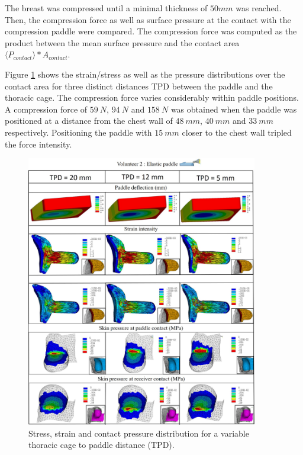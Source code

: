  The breast was compressed until a minimal thickness of $50mm$ was reached. Then, the compression force as well as surface pressure at the contact with the compression paddle were compared. The compression force was computed as the product between the mean surface pressure and the contact area $\langle P_{contact}\rangle \ast  A_{contact}$.

Figure \ref{fig:elasticpaddle} shows the strain/stress as well as the pressure distributions over the contact area for three  distinct distances TPD between the paddle and the thoracic cage. The compression force varies considerably within paddle positions. A compression force of $59\ N$, $94\ N$ and $158\ N$ was obtained when the paddle was positioned at a distance from the chest wall of $48\  mm$, $40\  mm$ and $33\ mm$ respectively. Positioning the paddle with $15\ mm$ closer to the chest wall tripled the force intensity. 
 
\begin{figure}[!h]
\centering
\includegraphics[width=0.9\textwidth,keepaspectratio]{figures/elasticpaddleresults.jpg} 
\caption{Stress, strain and contact pressure distribution for a variable thoracic cage to paddle distance (TPD).}\label{fig:elasticpaddle}
\end{figure}


